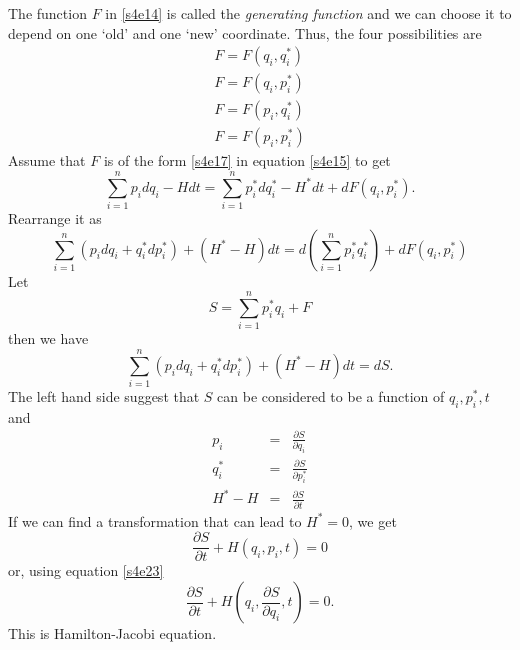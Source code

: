 \documentclass{article}
\newcommand{\pd}[2]{\frac{\partial{#1}}{\partial{#2}}}
\numberwithin{equation}{section}
\theoremstyle{plain}
\numberwithin{thm}{section}
\theoremstyle{plain}
\numberwithin{prop}{section}
\theoremstyle{definition}
\numberwithin{defn}{section}
\theoremstyle{remark}
\begin{document}
The function $F$ in \eqref{s4e14} is called the \emph{generating function}
and we can choose it to depend on one `old' and one `new' coordinate. Thus,
the four possibilities are
\begin{eqnarray}
F = F(q_i, q_i^\ast) \label{s4e16} \\
F = F(q_i, p_i^\ast) \label{s4e17} \\
F = F(p_i, q_i^\ast) \label{s4e18} \\
F = F(p_i, p_i^\ast) \label{s4e19} 
\end{eqnarray}
Assume that $F$ is of the form \eqref{s4e17} in equation \eqref{s4e15} to get
\begin{equation}\label{s4e20}
\sum_{i=1}^np_idq_i - Hdt = \sum_{i=1}^np^\ast_idq^\ast_i - H^\ast dt + 
dF(q_i, p_i^\ast).
\end{equation}
Rearrange it as
\[
\sum_{i=1}^n(p_idq_i + q_i^\ast dp^\ast_i) + (H^\ast - H)dt = 
d\left(\sum_{i=1}^n p_i^\ast q_i^\ast\right) + dF(q_i, p_i^\ast)
\]
Let
\begin{equation}\label{s4e21}
S = \sum_{i=1}^n p_i^\ast q_i + F
\end{equation}
then we have
\begin{equation}\label{s4e22}
\sum_{i=1}^n(p_idq_i + q_i^\ast dp^\ast_i) + (H^\ast - H)dt = dS.
\end{equation}
The left hand side suggest that $S$ can be considered to be a function of
$q_i, p_i^\ast, t$ and
\begin{eqnarray}
p_i &=& \pd{S}{q_i} \label{s4e23} \\
q_i^\ast &=& \pd{S}{p_i^\ast} \label{s4e24} \\
H^\ast - H &=& \pd{S}{t} \label{s4e25}
\end{eqnarray}
If we can find a transformation that can lead to $H^\ast = 0$, we get
\begin{equation}\label{s4e26}
\pd{S}{t} + H\left(q_i, p_i, t\right) = 0
\end{equation}
or, using equation \eqref{s4e23}
\begin{equation}\label{s4e27}
\pd{S}{t} + H\left(q_i, \pd{S}{q_i}, t\right) = 0.
\end{equation}
This is Hamilton-Jacobi equation.
\end{document}
